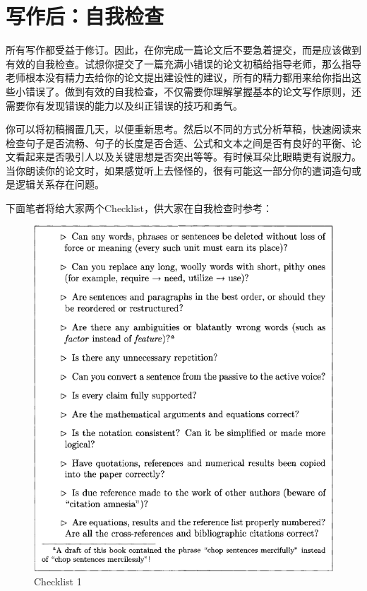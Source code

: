 \documentclass{formatBook}
\begin{document}
\section{写作后：自我检查}
所有写作都受益于修订。因此，在你完成一篇论文后不要急着提交，而是应该做到有效的自我检查。试想你提交了一篇充满小错误的论文初稿给指导老师，那么指导老师根本没有精力去给你的论文提出建设性的建议，所有的精力都用来给你指出这些小错误了。做到有效的自我检查，不仅需要你理解掌握基本的论文写作原则，还需要你有发现错误的能力以及纠正错误的技巧和勇气。\par
你可以将初稿搁置几天，以便重新思考。然后以不同的方式分析草稿，快速阅读来检查句子是否流畅、句子的长度是否合适、公式和文本之间是否有良好的平衡、论文看起来是否吸引人以及关键思想是否突出等等。有时候耳朵比眼睛更有说服力。当你朗读你的论文时，如果感觉听上去怪怪的，很有可能这一部分你的遣词造句或是逻辑关系存在问题。\par
下面笔者将给大家两个Checklist，供大家在自我检查时参考：
\begin{figure}[htb]
    \centering
    \includegraphics{figure/Figure 7.1.png}
    \caption{Checklist 1}
    \label{fig:my_label}
\end{figure}
\end{document}
